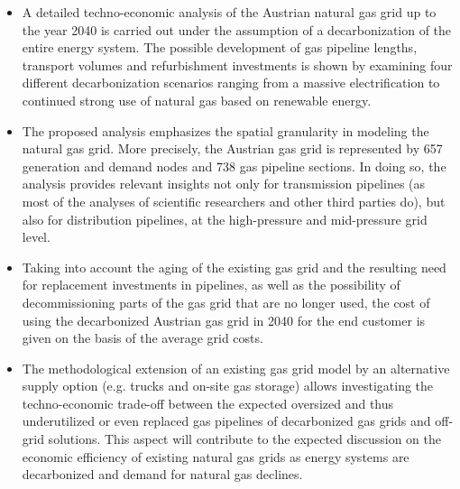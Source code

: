 \begin{itemize}
	\item A detailed techno-economic analysis of the Austrian natural gas grid up to the year 2040 is carried out under the assumption of a decarbonization of the entire energy system. The possible development of gas pipeline lengths, transport volumes and refurbishment investments is shown by examining four different decarbonization scenarios ranging from a massive electrification to continued strong use of natural gas based on renewable energy. 
	\item The proposed analysis emphasizes the spatial granularity in modeling the natural gas grid. More precisely, the Austrian gas grid is represented by 657 generation and demand nodes and 738 gas pipeline sections. In doing so, the analysis provides relevant insights not only for transmission pipelines (as most of the analyses of scientific researchers and other third parties do), but also for distribution pipelines, at the high-pressure and mid-pressure grid level.
	\item Taking into account the aging of the existing gas grid and the resulting need for replacement investments in pipelines, as well as the possibility of decommissioning parts of the gas grid that are no longer used, the cost of using the decarbonized Austrian gas grid in 2040 for the end customer is given on the basis of the average grid costs.
	\item The methodological extension of an existing gas grid model by an alternative supply option (e.g. trucks and on-site gas storage) allows investigating the techno-economic trade-off between the expected oversized and thus underutilized or even replaced gas pipelines of decarbonized gas grids and off-grid solutions. This aspect will contribute to the expected discussion on the economic efficiency of existing natural gas grids as energy systems are decarbonized and demand for natural gas declines. 
\end{itemize}